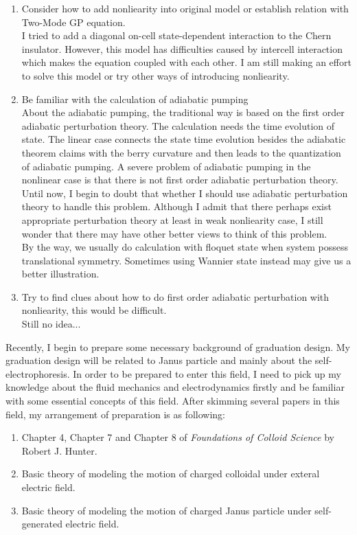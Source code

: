 \documentclass[fontsize=11pt, %
                             paper=a4, %
                             twoside, %
                             captions=tableheading,
                             index=totoc,
                             hyperref]{labbook}
\begin{document}
\begin{addmargin}[4cm]{0cm}
\begin{enumerate}
\item
Consider how to add nonliearity into original model or establish relation with Two-Mode GP equation.\\
I tried to add a diagonal on-cell state-dependent interaction to the Chern insulator. However, this model has difficulties caused by intercell interaction which makes the equation coupled with each other. I am still making an effort to solve this model or try other ways of introducing nonliearity.
\item
Be familiar with the calculation of adiabatic pumping\\
About the adiabatic pumping, the traditional way is based on the first order adiabatic perturbation theory. The calculation needs the time evolution of state. The linear case connects the state time evolution besides the adiabatic theorem claims with the berry curvature and then leads to the quantization of adiabatic pumping. A severe problem of adiabatic pumping in the nonlinear case is that there is not first order adiabatic perturbation theory. Until now, I begin to doubt that whether I should use adiabatic perturbation theory to handle this problem. Although I admit that there perhaps exist appropriate perturbation theory at least in weak nonliearity case, I still wonder that there may have other better views to think of this problem.\\
By the way, we usually do calculation with floquet state when system possess translational symmetry. Sometimes using Wannier state instead may give us a better illustration.
\item
Try to find clues about how to do first order adiabatic perturbation with nonliearity, this would be difficult.\\
Still no idea...
\end{enumerate}
Recently, I begin to prepare some necessary background of graduation design. My graduation design will be related to Janus particle and mainly about the self-electrophoresis. In order to be prepared to enter this field, I need to pick up my knowledge about the fluid mechanics and electrodynamics firstly and be familiar with some essential concepts of this field. After skimming several papers in this field, my arrangement of preparation is as following:
\begin{enumerate}
\item
Chapter 4, Chapter 7 and Chapter 8 of \emph{Foundations of Colloid Science} by Robert J. Hunter.
\item
Basic theory of modeling the motion of charged colloidal under exteral electric field.
\item
Basic theory of modeling the motion of charged Janus particle under self-generated electric field.
\end{enumerate}


\end{addmargin}
\end{document}
